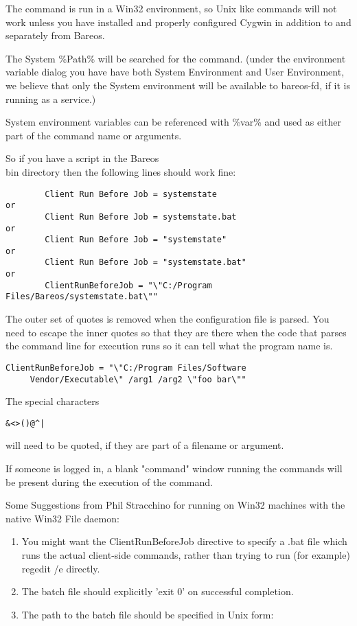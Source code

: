 \begin{description}
The command is run in a Win32 environment, so Unix like commands will not
work unless you have installed and properly configured Cygwin in addition
to and separately from Bareos.

The System \%Path\% will be searched for the command.  (under the
environment variable dialog you have have both System Environment and
User Environment, we believe that only the System environment will be
available to bareos-fd, if it is running as a service.)

System environment variables can be referenced with \%var\% and
used as either part of the command name or arguments.

So if you have a script in the Bareos\\bin directory then the following lines
should work fine:

\footnotesize
\begin{verbatim}
        Client Run Before Job = systemstate
or
        Client Run Before Job = systemstate.bat
or
        Client Run Before Job = "systemstate"
or
        Client Run Before Job = "systemstate.bat"
or
        ClientRunBeforeJob = "\"C:/Program Files/Bareos/systemstate.bat\""
\end{verbatim}
\normalsize

The outer set of quotes is removed when the configuration file is parsed.
You need to escape the inner quotes so that they are there when the code
that parses the command line for execution runs so it can tell what the
program name is.

\footnotesize
\begin{verbatim}
ClientRunBeforeJob = "\"C:/Program Files/Software
     Vendor/Executable\" /arg1 /arg2 \"foo bar\""
\end{verbatim}
\normalsize

The special characters
\begin{verbatim}
&<>()@^|
\end{verbatim}
will need to be quoted,
if they are part of a filename or argument.

If someone is logged in, a blank "command" window running the commands
will be present during the execution of the command.

Some Suggestions from Phil Stracchino for running on Win32 machines with
the native Win32 File daemon:

\begin{enumerate}
\item You might want the ClientRunBeforeJob directive to specify a .bat
      file which runs the actual client-side commands, rather than trying
      to run (for example) regedit /e directly.
\item The batch file should explicitly 'exit 0' on successful completion.
\item The path to the batch file should be specified in Unix form:


\end{enumerate}
\end{description}
